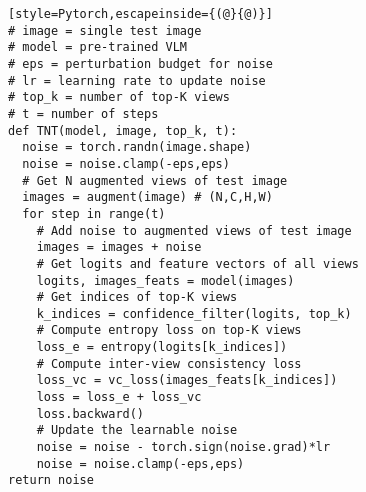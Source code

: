 \begin{algorithm}[t]
\caption{PyTorch style Pseudocode for TNT}
\label{alg:tnt}
\vspace{-1.ex}
\begin{lstlisting}[style=Pytorch,escapeinside={(@}{@)}]
# image = single test image 
# model = pre-trained VLM
# eps = perturbation budget for noise
# lr = learning rate to update noise
# top_k = number of top-K views
# t = number of steps
def TNT(model, image, top_k, t):
  noise = torch.randn(image.shape)
  noise = noise.clamp(-eps,eps)
  # Get N augmented views of test image
  images = augment(image) # (N,C,H,W)
  for step in range(t)
    # Add noise to augmented views of test image 
    images = images + noise
    # Get logits and feature vectors of all views 
    logits, images_feats = model(images)
    # Get indices of top-K views 
    k_indices = confidence_filter(logits, top_k)
    # Compute entropy loss on top-K views
    loss_e = entropy(logits[k_indices])
    # Compute inter-view consistency loss
    loss_vc = vc_loss(images_feats[k_indices]) 
    loss = loss_e + loss_vc
    loss.backward()
    # Update the learnable noise
    noise = noise - torch.sign(noise.grad)*lr
    noise = noise.clamp(-eps,eps)
return noise
\end{lstlisting}
\vspace{-1.ex}
\end{algorithm}
